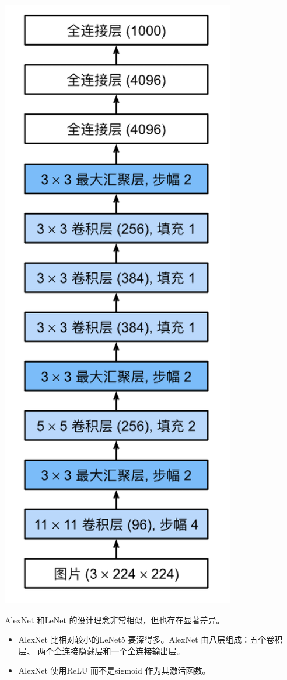 \documentclass[a4paper,12pt]{article}
\begin{document}
\centering %
\includegraphics[scale=0.5]{images/AlexNet.png}
\justifying

AlexNet 和LeNet 的设计理念非常相似，但也存在显著差异。
\begin{itemize}
    \item AlexNet 比相对较小的LeNet5 要深得多。AlexNet 由八层组成：五个卷积层、
两个全连接隐藏层和一个全连接输出层。

    \item AlexNet 使用ReLU 而不是sigmoid 作为其激活函数。
\end{itemize}
\end{document}
